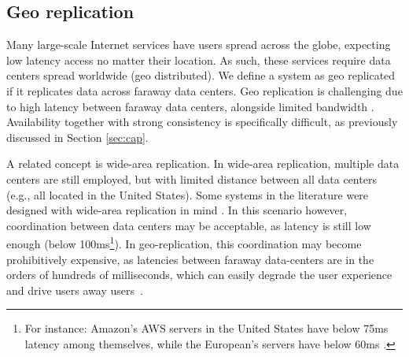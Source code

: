 

\subsection{Geo replication}
\label{subsec:geo}

Many large-scale Internet services have users spread across the globe, expecting low latency access no matter their location.
As such, these services require data centers spread worldwide (geo distributed).
We define a system as  geo replicated if it replicates data across faraway data centers.
Geo replication is challenging due to high latency between faraway data centers, alongside limited bandwidth \cite{mdcc, eiger, chronocache, slog}.
Availability together with strong consistency is specifically difficult, as previously discussed in Section \ref{sec:cap}.

A related concept is wide-area replication.
In wide-area replication, multiple data centers are still employed, but with limited distance between all data centers (e.g., all located in the United States).
Some systems in the literature were designed with wide-area replication in mind \cite{spanner, cops, megastore}.
In this scenario however, coordination between data centers may be acceptable, as latency is still low enough \cite{spanner, AWSLatency} (below 100ms\footnote{For instance: Amazon's AWS servers in the United States have below 75ms latency among themselves, while the European's servers have below 60ms \cite{AWSLatency}.}).
In geo-replication, this coordination may become prohibitively expensive, as latencies between faraway data-centers are in the orders of hundreds of milliseconds, which can easily degrade the user experience and drive users away users~\cite{mdcc, eiger, chronocache, AWSLatency, LatencyIncrease}.

